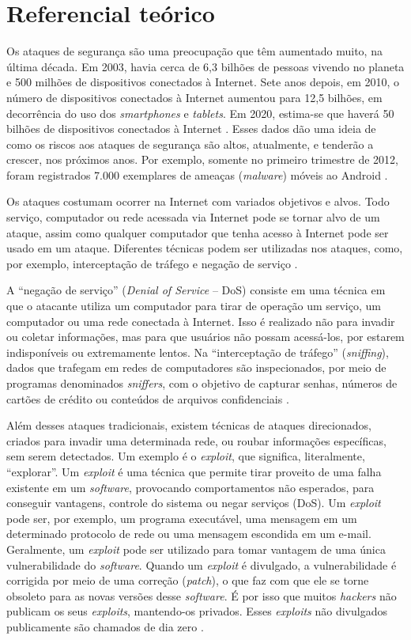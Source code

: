 \section{Referencial teórico}
Os ataques de segurança são uma preocupação que têm aumentado muito, na última década. Em 2003, havia cerca de 6,3 bilhões de pessoas vivendo no planeta e 500 milhões de dispositivos conectados à Internet. Sete anos depois, em 2010, o número de dispositivos conectados à Internet aumentou para 12,5 bilhões, em decorrência do uso dos \textit{smartphones} e \textit{tablets}. Em 2020, estima-se que haverá 50 bilhões de dispositivos conectados à Internet \cite{Evans:2011}. Esses dados dão uma ideia de como os riscos aos ataques de segurança são altos, atualmente, e tenderão a crescer, nos próximos anos. Por exemplo, somente no primeiro trimestre de 2012, foram registrados 7.000 exemplares de ameaças (\textit{malware}) móveis ao Android \cite{McAffe:2012}.

Os ataques costumam ocorrer na Internet com variados objetivos e alvos. Todo serviço, computador ou rede acessada via Internet pode se tornar alvo de um ataque, assim como qualquer computador que tenha acesso à Internet pode ser usado em um ataque. Diferentes técnicas podem ser utilizadas nos ataques, como, por exemplo, interceptação de tráfego e negação de serviço \cite{CERT:2012}.


A “negação de serviço” (\textit{Denial of Service} – DoS) consiste em uma técnica em que o atacante utiliza um computador para tirar de operação um serviço, um computador ou uma rede conectada à Internet. Isso é realizado não para invadir ou coletar informações, mas para que usuários não possam acessá-los, por estarem indisponíveis ou extremamente lentos. Na “interceptação de tráfego” (\textit{sniffing}), dados que trafegam em redes de computadores são inspecionados, por meio de programas denominados \textit{sniffers}, com o objetivo de capturar senhas, números de cartões de crédito ou conteúdos de arquivos confidenciais \cite{CERT:2012}.

Além desses ataques tradicionais, existem técnicas de ataques direcionados, criados para invadir uma determinada rede, ou roubar informações específicas, sem serem detectados. Um exemplo é o \textit{exploit}, que significa, literalmente, “explorar”. Um \textit{exploit} é uma técnica que permite tirar proveito de uma falha existente em um \textit{software}, provocando comportamentos não esperados, para conseguir vantagens, controle do sistema ou negar serviços (DoS). Um \textit{exploit} pode ser, por exemplo, um programa executável, uma mensagem em um determinado protocolo de rede ou uma mensagem escondida em um e-mail. Geralmente, um \textit{exploit} pode ser utilizado para tomar vantagem de uma única vulnerabilidade do \textit{software}. Quando um \textit{exploit} é divulgado, a vulnerabilidade é corrigida por meio de uma correção (\textit{patch}), o que faz com que ele se torne obsoleto para as novas versões desse \textit{software}. É por isso que muitos \textit{hackers} não publicam os seus \textit{exploits}, mantendo-os privados. Esses \textit{exploits} não divulgados publicamente são chamados de dia zero \cite{Pedrosa:2007}.

